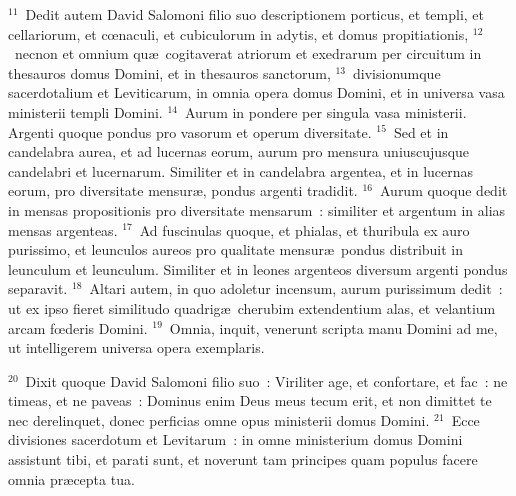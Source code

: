 ${}^{11}$~Dedit autem David Salomoni filio suo descriptionem porticus, et templi, et cellariorum, et cœnaculi, et cubiculorum in adytis, et domus propitiationis,
${}^{12}$~necnon et omnium qu\ae\ cogitaverat atriorum et exedrarum per circuitum in thesauros domus Domini, et in thesauros sanctorum,
${}^{13}$~divisionumque sacerdotalium et Leviticarum, in omnia opera domus Domini, et in universa vasa ministerii templi Domini.
${}^{14}$~Aurum in pondere per singula vasa ministerii. Argenti quoque pondus pro vasorum et operum diversitate.
${}^{15}$~Sed et in candelabra aurea, et ad lucernas eorum, aurum pro mensura uniuscujusque candelabri et lucernarum. Similiter et in candelabra argentea, et in lucernas eorum, pro diversitate mensur\ae , pondus argenti tradidit.
${}^{16}$~Aurum quoque dedit in mensas propositionis pro diversitate mensarum~: similiter et argentum in alias mensas argenteas.
${}^{17}$~Ad fuscinulas quoque, et phialas, et thuribula ex auro purissimo, et leunculos aureos pro qualitate mensur\ae\ pondus distribuit in leunculum et leunculum. Similiter et in leones argenteos diversum argenti pondus separavit.
${}^{18}$~Altari autem, in quo adoletur incensum, aurum purissimum dedit~: ut ex ipso fieret similitudo quadrig\ae\ cherubim extendentium alas, et velantium arcam fœderis Domini.
${}^{19}$~Omnia, inquit, venerunt scripta manu Domini ad me, ut intelligerem universa opera exemplaris.


${}^{20}$~Dixit quoque David Salomoni filio suo~: Viriliter age, et confortare, et fac~: ne timeas, et ne paveas~: Dominus enim Deus meus tecum erit, et non dimittet te nec derelinquet, donec perficias omne opus ministerii domus Domini.
${}^{21}$~Ecce divisiones sacerdotum et Levitarum~: in omne ministerium domus Domini assistunt tibi, et parati sunt, et noverunt tam principes quam populus facere omnia pr\ae cepta tua.

